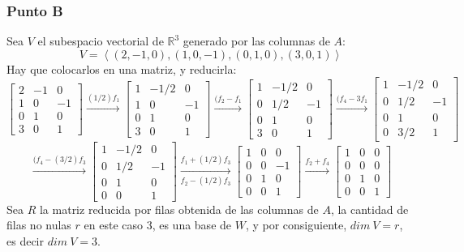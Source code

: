 \documentclass[a4paper,12pt]{article}
\begin{document}
\subsubsection{Punto B}
Sea $V$ el subespacio vectorial de $\mathds{R}^3$ generado por las columnas de $A$:
$$
V=\left \langle (2,-1,0), (1,0,-1), (0,1,0), (3,0,1) \right \rangle
$$
Hay que colocarlos en una matriz, y reducirla:
$$
\begin{bmatrix}
2 & -1 & 0\\ 
1 & 0 & -1\\ 
0 & 1 & 0 \\
3 & 0 & 1
\end{bmatrix}
\xrightarrow[]{(1/2)f_1}
\begin{bmatrix}
1 & -1/2 & 0\\ 
1 & 0 & -1\\ 
0 & 1 & 0 \\
3 & 0 & 1
\end{bmatrix}
\xrightarrow[]{(f_2-f_1}
\begin{bmatrix}
1 & -1/2 & 0\\ 
0 & 1/2 & -1\\ 
0 & 1 & 0 \\
3 & 0 & 1
\end{bmatrix}
\xrightarrow[]{(f_4-3f_1}
\begin{bmatrix}
1 & -1/2 & 0\\ 
0 & 1/2 & -1\\ 
0 & 1 & 0 \\
0 & 3/2 & 1
\end{bmatrix}
$$
$$
\xrightarrow[]{(f_4-(3/2)f_3}
\begin{bmatrix}
1 & -1/2 & 0\\ 
0 & 1/2 & -1\\ 
0 & 1 & 0 \\
0 & 0 & 1
\end{bmatrix}
\xrightarrow[f_2-(1/2)f_3]{f_1+(1/2)f_3}
\begin{bmatrix}
1 & 0 & 0\\ 
0 & 0 & -1\\ 
0 & 1 & 0 \\
0 & 0 & 1
\end{bmatrix}
\xrightarrow[]{f_2+f_4}
\begin{bmatrix}
1 & 0 & 0\\ 
0 & 0 & 0\\ 
0 & 1 & 0 \\
0 & 0 & 1
\end{bmatrix}
$$
Sea $R$ la matriz reducida por filas obtenida de las columnas de $A$, la cantidad de filas no nulas $r$ en este caso $3$, es una base de $W$, y por consiguiente, $dim \ V = r$, es decir $dim \ V = 3$.
\end{document}

